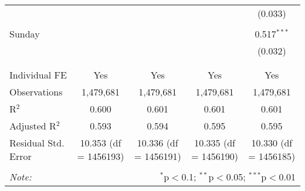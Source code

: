 \documentclass[
]{article}
\begin{document}
\begin{table}[!htbp]
{\begin{tabular}{@{\extracolsep{5pt}}lcccc}
  &  &  &  & (0.033) \\ 
  & & & & \\ 
 Sunday &  &  &  & 0.517$^{***}$ \\ 
  &  &  &  & (0.032) \\ 
  & & & & \\ 
\hline \\[-1.8ex] 
Individual FE & Yes & Yes & Yes & Yes \\ 
Observations & 1,479,681 & 1,479,681 & 1,479,681 & 1,479,681 \\ 
R$^{2}$ & 0.600 & 0.601 & 0.601 & 0.601 \\ 
Adjusted R$^{2}$ & 0.593 & 0.594 & 0.595 & 0.595 \\ 
Residual Std. Error & 10.353 (df = 1456193) & 10.336 (df = 1456191) & 10.335 (df = 1456190) & 10.330 (df = 1456185) \\ 
\hline 
\hline \\[-1.8ex] 
\textit{Note:}  & \multicolumn{4}{r}{$^{*}$p$<$0.1; $^{**}$p$<$0.05; $^{***}$p$<$0.01} \\ 
\end{tabular}
} 
\end{table} 
\newpage
\end{document}
